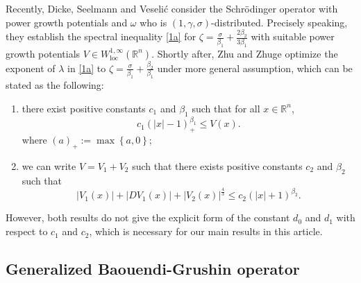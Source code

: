 \documentclass{article}
\numberwithin{equation}{section}
\newcommand\R{\ensuremath{\mathbb{R}}}
\numberwithin{equation}{section}
\theoremstyle{definition}
\begin{document}
Recently, Dicke, Seelmann and Veseli\'{c} \cite{dicke2022spectral} consider the Schrödinger operator with power growth potentials and $\omega$ who is $(1,\gamma,\sigma)$-distributed. Precisely speaking, they establish the spectral inequality \eqref{1a} for $\zeta = \frac{\sigma }{\beta_1}+\frac{2\beta_2}{3\beta_1}$ with suitable power growth potentials $V\in W_{\mathrm{loc}}^{1,\infty}(\R^{n})$.
Shortly after, Zhu and Zhuge \cite{zhu2023spectral} optimize the exponent of $\lambda$ in \eqref{1a} to $\zeta =\frac{\sigma }{\beta_1}+\frac{\beta_2}{\beta_1}$ under more general assumption, which can be stated as the following: 
\begin{enumerate}
	\item there exist positive constants $c_1$ and $\beta_1$ such that for all $x\in \R^{n}$,
		\begin{equation}
			c_1 (|x|-1)_+^{\beta_1}\le V(x).\label{1.1}
		\end{equation}
		where $(a)_+ :=\max \left\{a,0\right\} $;
	\item we can write $V=V_1+V_2$ such that there exists positive constants $c_2$ and $\beta_2$ such that 
		\begin{equation}
			|V_1(x)|+|DV_1(x)|+|V_2(x)|^{\frac{4}{3}}\le c_2(|x|+1)^{\beta_2}.
		\end{equation}
\end{enumerate}
However, both results do not give the explicit form of the constant $d_0$ and  $d_1$ with respect to $c_1$ and $c_2$, which is necessary for our main results in this article.   

\subsection{Generalized Baouendi-Grushin operator}


\end{document}
